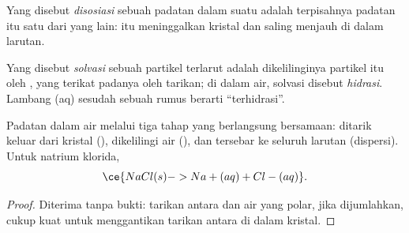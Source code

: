 \begin{definition}[Disosiasi]\label{def:g11:dissolution:dissociation}
Yang disebut \emph{disosiasi} sebuah padatan  dalam
suatu  adalah terpisahnya  padatan itu satu dari yang
lain:  itu meninggalkan kristal dan saling menjauh di dalam
larutan.
\end{definition}

\begin{definition}\label{def:g11:dissolution:solvation}
Yang disebut \emph{solvasi} sebuah partikel terlarut
adalah dikelilinginya partikel itu oleh  , yang
terikat padanya oleh tarikan; di dalam air, solvasi disebut
\emph{hidrasi}. Lambang (aq) sesudah sebuah rumus berarti
``terhidrasi''.
\end{definition}

\begin{proposition}\label{prop:g11:dissolution:stages}
Padatan   dalam air melalui tiga tahap yang berlangsung
bersamaan:  ditarik keluar dari kristal (), dikelilingi
 air (), dan tersebar ke seluruh larutan
(dispersi). Untuk natrium klorida,
\[
  \ce{NaCl(s) -> Na+(aq) + Cl-(aq)} .
\]
\end{proposition}

\begin{proof}
Diterima tanpa bukti: tarikan antara  dan  air
yang polar, jika dijumlahkan, cukup kuat untuk menggantikan tarikan
antara  di dalam kristal.
\end{proof}

